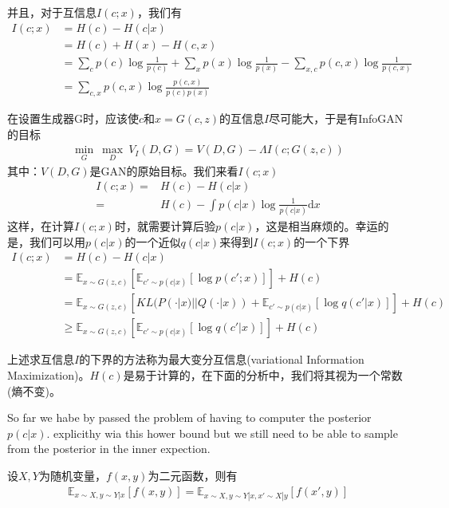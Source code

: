             并且，对于互信息$I(c;x)$，我们有
            \begin{align*}
            I(c;x) &= H(c) - H(c|x)\\
            &=H(c)+H(x) - H(c,x)\\
            &=\sum_c p(c) \log \frac{1}{p(c)} + \sum _x p(x)\log \frac{1}{p(x)} - \sum_{x,c}p(c,x)\log \frac{1}{p(c,x)}\\
            &=\sum_{c,x}p(c,x) \log \frac{p(c,x)}{p(c)p(x)}
            \end{align*}
            \par
            在设置生成器G时，应该使$c$和$x = G(c,z)$的互信息$I$尽可能大，于是有InfoGAN的目标
            \begin{align*}
            \min_G\ \max_D\ V_I(D,G) = V(D,G)-\Lambda I(c;G(z,c))
            \end{align*}
            其中：$V(D,G)$是GAN的原始目标。我们来看$I(c;x)$
            \begin{align*}
            I(c;x) =&  H(c) - H(c|x)\\
            =& H(c) - \int p(c|x)\log \frac{1}{p(c|x)}\mathrm{d}x
            \end{align*}
            这样，在计算$I(c;x)$时，就需要计算后验$p(c|x)$，这是相当麻烦的。幸运的是，我们可以用$p(c|x)$的一个近似$q(c|x)$来得到$I(c;x)$的一个下界
            \begin{align*}
            I(c;x) &= H(c) - H(c|x)\\
            &=\mathbb{E}_{x\sim G(z,c)} \left [ \mathbb{E}_{c'\sim p(c|x)}[\log p(c';x)]\right] + H(c)\\
            &=\mathbb{E}_{x\sim G(z,c)}\left[ KL(P(\cdot|x)||Q(\cdot|x))+\mathbb{E}_{c'\sim p(c|x)}[\log q(c'|x)] \right]+H(c)\\
            &\geqslant\mathbb{E}_{x\sim G(z,c)} \left[\mathbb{E}_{c'\sim p(c|x)}[\log q(c'|x)]  \right]+H(c)
            \end{align*}
            \par
            上述求互信息$I$的下界的方法称为最大变分互信息(variational Information Maximization)。$H(c)$是易于计算的，在下面的分析中，我们将其视为一个常数(熵不变)。
            \par
            So far we habe by passed the problem of having to computer the posterior $p(c|x)$. explicithy wia this hower bound but we still need to be able to sample from the posterior in the inner expection.
            \begin{lemma}[lemma 5.1]
            设$X,Y$为随机变量，$f(x,y)$为二元函数，则有
            \begin{align*}
            \mathbb{E}_{x\sim X,y\sim Y|x}[f(x,y)] = \mathbb{E}_{x\sim X,y\sim Y|x,x'\sim X|y}[f(x',y)]
            \end{align*}
            \end{lemma}
